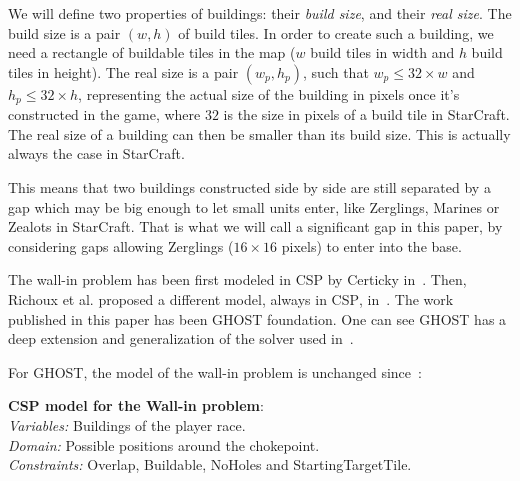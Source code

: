 \documentclass[journal]{IEEEtran}
\newcommand{\csp}{\textsc{CSP}\xspace}
\newcommand{\ghost}{\textsc{GHOST}\xspace}
\newcommand{\modelcsp}[4]%
{ \begin{trivlist}
  \item[]%
    \textbf{CSP model for #1}:\\
    \textit{Variables:} #2\\
    \textit{Domain:} #3\\
    \textit{Constraints:} #4
  \end{trivlist}%
}
\begin{document}
We will  define two properties  of buildings: their {\em  build size},
and their {\em real size}. The build  size is a pair $(w, h)$ of build
tiles. In  order to  create such  a building, we  need a  rectangle of
buildable tiles  in the map  ($w$ build tiles  in width and  $h$ build
tiles in height). The real size is a pair $(w_p, h_p)$, such that $w_p
\leq 32 \times w$ and $h_p  \leq 32 \times h$, representing the actual
size of  the building  in pixels  once it's  constructed in  the game,
where $32$  is the size  in pixels of a  build tile in  StarCraft. The
real size of a building can then  be smaller than its build size. This
is actually always the case in StarCraft.

This  means that  two buildings  constructed  side by  side are  still
separated by a gap  which may be big enough to  let small units enter,
like Zerglings, Marines or Zealots in  StarCraft. That is what we will
call a  significant gap  in this paper,  by considering  gaps allowing
Zerglings ($16 \times 16$ pixels) to enter into the base.

The  wall-in  problem has  been  first  modeled  in \csp  by  Certicky
in~\cite{Certicky13}. Then, Richoux et al. proposed a different model,
always  in \csp,  in~\cite{RichouxUO14}.  The  work published  in this
paper  has been  \ghost  foundation. One  can see  \ghost  has a  deep
extension and generalization of the solver used in~\cite{RichouxUO14}.

For  \ghost,   the  model   of  the   wall-in  problem   is  unchanged
since~\cite{RichouxUO14}:
\modelcsp{the Wall-in problem}%
{Buildings of the player race.}%
{Possible positions around the chokepoint.}%
{Overlap, Buildable, NoHoles and StartingTargetTile.}
\end{document}
